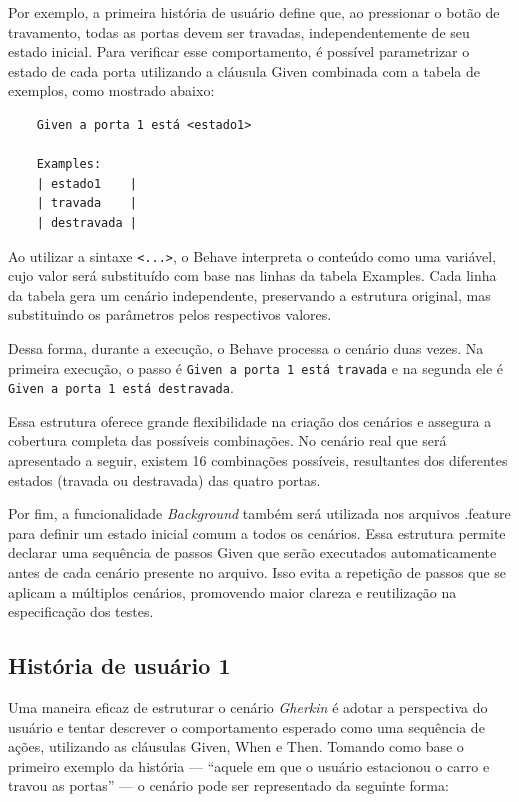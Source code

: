 Por exemplo, a primeira história de usuário define que, ao pressionar o botão de travamento, todas as portas devem ser travadas, independentemente de seu estado 
inicial. Para verificar esse comportamento, é possível parametrizar o estado de cada porta utilizando a cláusula Given combinada com a tabela de exemplos, 
como mostrado abaixo:

\begin{verbatim}
    Given a porta 1 está <estado1>
    
    Examples:
    | estado1    |
    | travada    |
    | destravada |
\end{verbatim}


Ao utilizar a sintaxe \texttt{<...>}, o Behave interpreta o conteúdo como uma variável, cujo valor será substituído com base nas linhas da tabela Examples. Cada 
linha da tabela gera um cenário independente, preservando a estrutura original, mas substituindo os parâmetros pelos respectivos valores.

Dessa forma, durante a execução, o Behave processa o cenário duas vezes. Na primeira execução, o passo é \texttt{Given a porta 1 está travada} e na segunda 
ele é \texttt{Given a porta 1 está destravada}.

Essa estrutura oferece grande flexibilidade na criação dos cenários e assegura a cobertura completa das possíveis combinações. No cenário real que será apresentado 
a seguir, existem 16 combinações possíveis, resultantes dos diferentes estados (travada ou destravada) das quatro portas.

Por fim, a funcionalidade \textit{Background} também será utilizada nos arquivos .feature para definir um estado inicial comum a todos os cenários. Essa estrutura permite 
declarar uma sequência de passos Given que serão executados automaticamente antes de cada cenário presente no arquivo. Isso evita a repetição de passos que se 
aplicam a múltiplos cenários, promovendo maior clareza e reutilização na especificação dos testes.

\subsection{História de usuário 1}

Uma maneira eficaz de estruturar o cenário \textit{Gherkin} é adotar a perspectiva do usuário e tentar descrever o comportamento esperado como uma sequência de ações, 
utilizando as cláusulas Given, When e Then. Tomando como base o primeiro exemplo da história — “aquele em que o usuário estacionou o carro e travou as portas” — 
o cenário pode ser representado da seguinte forma:

